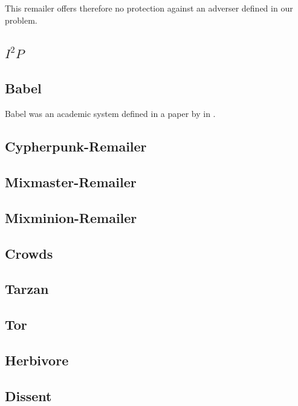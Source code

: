 This remailer offers therefore no protection against an adverser defined in our problem.

\subsection{$I^2P$}

\subsection{Babel}
Babel was an academic system defined in a paper by \citeauthor{babel} in \citeyear{babel}\cite{babel}.

\subsection{Cypherpunk-Remailer\label{sec:remCypherpunk}}

\subsection{Mixmaster-Remailer\label{sec:remMixmaster}}

\subsection{Mixminion-Remailer\label{sec:remMixminion}}

\subsection{Crowds}

\subsection{Tarzan}

\subsection{Tor\label{sec:tor}}

\subsection{Herbivore}

\subsection{Dissent}

